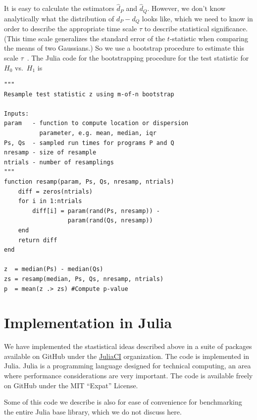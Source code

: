 \documentclass[conference]{IEEEtran}
\begin{document}
It is easy to calculate the estimators $\hat d_P$ and $\hat d_Q$. However, we don't know
analytically what the distribution of $d_P - d_Q$ looks like, which we need to know in order
to describe the appropriate time scale $\tau$ to describe statistical significance. (This
time scale generalizes the standard error of the $t$-statistic when comparing the means of
two Gaussians.) So we use a bootstrap procedure to estimate this scale
$\tau$~\cite{Chernick2008}. The Julia code for the bootstrapping procedure for the test
statistic for $H_0$ vs.\ $H_1$ is

\begin{lstlisting}
"""
Resample test statistic z using m-of-n bootstrap

Inputs:
param   - function to compute location or dispersion
          parameter, e.g. mean, median, iqr
Ps, Qs  - sampled run times for programs P and Q
nresamp - size of resample
ntrials - number of resamplings
"""
function resamp(param, Ps, Qs, nresamp, ntrials)
    diff = zeros(ntrials)
    for i in 1:ntrials
        diff[i] = param(rand(Ps, nresamp)) -
                  param(rand(Qs, nresamp))
    end
    return diff
end

z  = median(Ps) - median(Qs)
zs = resamp(median, Ps, Qs, nresamp, ntrials)
p  = mean(z .> zs) #Compute p-value
\end{lstlisting}



\section{Implementation in Julia}

We have implemented the stastistical ideas described above in a suite of packages available
on GitHub under the \href{https://github.com/JuliaCI}{JuliaCI} organization. The code is
implemented in Julia. Julia is a programming language designed for technical computing, an
area where performance considerations are very important. The code is available freely on
GitHub under the MIT ``Expat'' License.

Some of this code we describe is also for ease of convenience for benchmarking the entire
Julia base library, which we do not discuss here.
\end{document}
